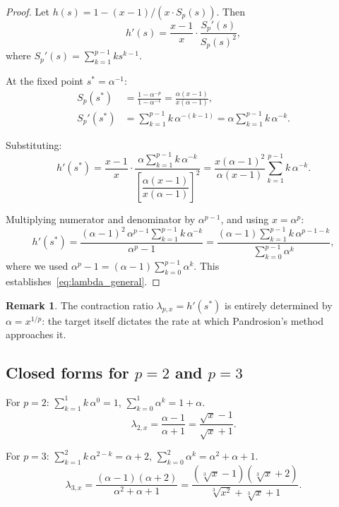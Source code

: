 \documentclass[11pt,a4paper]{article}
\theoremstyle{definition}
\newtheorem{remark}{Remark}[section]
\newcommand{\cbrt}[1]{\sqrt[3]{#1}}
\begin{document}
\begin{proof}
Let $h(s) = 1 - (x-1)/(x \cdot S_p(s))$. Then
\[
  h'(s) = \frac{x-1}{x} \cdot \frac{S_p'(s)}{S_p(s)^2},
\]
where $S_p'(s) = \sum_{k=1}^{p-1} k s^{k-1}$.

At the fixed point $s^* = \alpha^{-1}$:
\begin{align*}
  S_p(s^*) &= \frac{1 - \alpha^{-p}}{1 - \alpha^{-1}} = \frac{\alpha(x-1)}{x(\alpha-1)}, \\
  S_p'(s^*) &= \sum_{k=1}^{p-1} k\,\alpha^{-(k-1)} = \alpha \sum_{k=1}^{p-1} k\,\alpha^{-k}.
\end{align*}

Substituting:
\[
  h'(s^*) = \frac{x-1}{x} \cdot \frac{\alpha \sum_{k=1}^{p-1} k\,\alpha^{-k}}{\left[\dfrac{\alpha(x-1)}{x(\alpha-1)}\right]^2}
  = \frac{x(\alpha-1)^2}{\alpha(x-1)} \sum_{k=1}^{p-1} k\,\alpha^{-k}.
\]

Multiplying numerator and denominator by $\alpha^{p-1}$, and using $x = \alpha^p$:
\[
  h'(s^*) = \frac{(\alpha-1)^2\,\alpha^{p-1}\sum_{k=1}^{p-1}k\,\alpha^{-k}}{\alpha^p - 1}
  = \frac{(\alpha-1)\sum_{k=1}^{p-1}k\,\alpha^{p-1-k}}{\sum_{k=0}^{p-1}\alpha^k},
\]
where we used $\alpha^p - 1 = (\alpha-1)\sum_{k=0}^{p-1}\alpha^k$. This establishes~\eqref{eq:lambda_general}.
\end{proof}

\begin{remark}
The contraction ratio $\lambda_{p,x} = h'(s^*)$ is entirely determined by $\alpha = x^{1/p}$: the target itself dictates the rate at which Pandrosion's method approaches it.
\end{remark}

\subsection{Closed forms for \texorpdfstring{$p=2$}{p=2} and \texorpdfstring{$p=3$}{p=3}}

For $p = 2$: $\sum_{k=1}^{1} k\,\alpha^{0} = 1$, $\sum_{k=0}^{1}\alpha^k = 1 + \alpha$.
\begin{equation}
  \label{eq:lambda2}
  \lambda_{2,x} = \frac{\alpha - 1}{\alpha + 1} = \frac{\sqrt{x} - 1}{\sqrt{x} + 1}.
\end{equation}

For $p = 3$: $\sum_{k=1}^{2} k\,\alpha^{2-k} = \alpha + 2$, $\sum_{k=0}^{2}\alpha^k = \alpha^2+\alpha+1$.
\begin{equation}
  \label{eq:lambda3}
  \lambda_{3,x} = \frac{(\alpha-1)(\alpha+2)}{\alpha^2 + \alpha + 1} = \frac{(\cbrt{x}-1)(\cbrt{x}+2)}{\cbrt{x^2}+\cbrt{x}+1}.
\end{equation}
\end{document}

